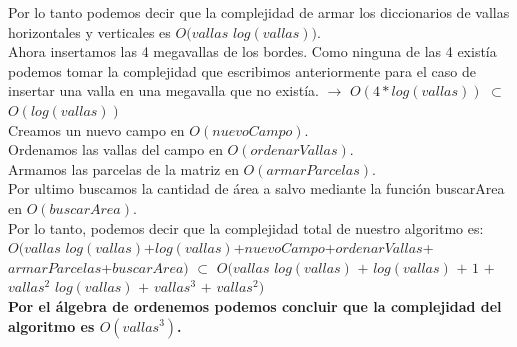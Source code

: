 \begin{itemize}
\begin{itemize}
\indent Por lo tanto podemos decir que la complejidad de armar los diccionarios
de vallas horizontales y verticales es $O(vallas$ $log(vallas))$.\\
\indent Ahora insertamos las 4 megavallas de los bordes. Como ninguna de las 4
existía podemos tomar la complejidad que escribimos anteriormente para el caso
de insertar una valla en una megavalla que no existía. $\rightarrow$
$O(4*log(vallas))$ $\subset$ $O(log(vallas))$\\
\indent Creamos un nuevo campo en $O(nuevoCampo)$.\\
\indent Ordenamos las vallas del campo en $O(ordenarVallas)$.\\
\indent Armamos las parcelas de la matriz en $O(armarParcelas)$.\\
\indent Por ultimo buscamos la cantidad de área a salvo mediante la función
buscarArea en $O(buscarArea)$.\\
\indent Por lo tanto, podemos decir que la complejidad total de nuestro
algoritmo es:\\
$O(vallas$
$log(vallas)$+$log(vallas)$+$nuevoCampo$+$ordenarVallas$+$armarParcelas$+$buscar
Area)$ $\subset$ $O(vallas$ $log(vallas)$ $+$ $log(vallas)$ $+$ $1$ $+$
$vallas^2$ $log(vallas)$ $+$ $vallas^3$ $+$
$vallas^2)$\\
\indent \textbf{Por el álgebra de ordenemos podemos concluir que la complejidad
del algoritmo es $O(vallas^3)$.}

\end{itemize}

\end{itemize}






